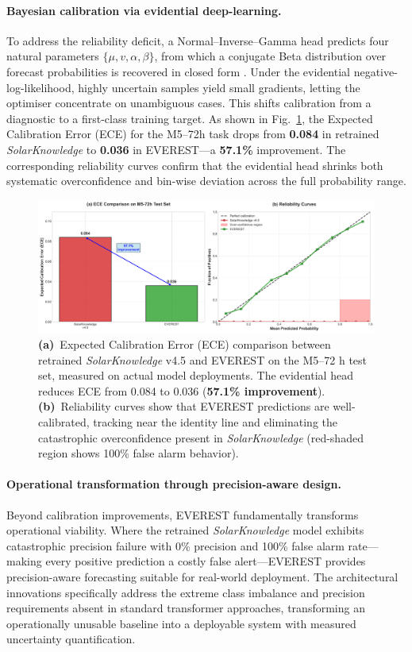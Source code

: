 \paragraph{Bayesian calibration via evidential deep-learning.}
To address the reliability deficit, a Normal–Inverse–Gamma head predicts four
natural parameters $\{\mu,v,\alpha,\beta\}$, from which a conjugate Beta distribution
over forecast probabilities is recovered in closed form \citep{sensoy2018evidential}.
Under the evidential negative-log-likelihood, highly uncertain samples yield
small gradients, letting the optimiser concentrate on unambiguous cases.
This shifts calibration from a diagnostic to a first-class training target.
As shown in Fig.~\ref{fig:ece_comparison}, the Expected Calibration Error (ECE)
for the M5–72h task drops from \textbf{0.084} in retrained \textit{SolarKnowledge}
to \textbf{0.036} in \textsc{EVEREST}—a \textbf{57.1\%} improvement.
The corresponding reliability curves confirm that the evidential head
shrinks both systematic overconfidence and bin-wise deviation across
the full probability range.

\begin{figure}[htbp]
  \centering
  \includegraphics[width=.75\linewidth]{figs/combined_calibration_analysis.png}
  \caption[Calibration improvement from evidential learning]{%
    \textbf{(a)}~Expected Calibration Error (ECE) comparison between
    retrained \textit{SolarKnowledge} v4.5 and \textsc{EVEREST} on the M5–72 h test set,
    measured on actual model deployments.  
    The evidential head reduces ECE from 0.084 to 0.036
    (\textbf{57.1\% improvement}).
    \textbf{(b)}~Reliability curves show that \textsc{EVEREST} predictions
    are well-calibrated, tracking near the identity line and eliminating
    the catastrophic overconfidence present in \textit{SolarKnowledge}
    (red-shaded region shows 100\% false alarm behavior).}
  \label{fig:ece_comparison}
\end{figure}

\paragraph{Operational transformation through precision-aware design.}
Beyond calibration improvements, \textsc{EVEREST} fundamentally transforms operational
viability. Where the retrained \textit{SolarKnowledge} model exhibits catastrophic
precision failure with 0\% precision and 100\% false alarm rate—making every positive
prediction a costly false alert—\textsc{EVEREST} provides precision-aware forecasting
suitable for real-world deployment. The architectural innovations specifically address
the extreme class imbalance and precision requirements absent in standard transformer
approaches, transforming an operationally unusable baseline into a deployable system
with measured uncertainty quantification. 
